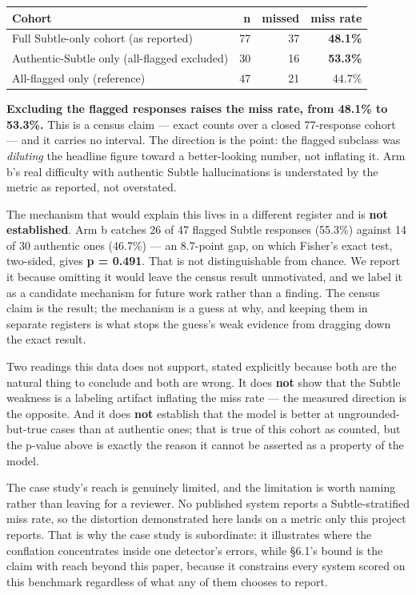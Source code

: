 \documentclass[11pt]{article}
\newcounter{none}
\begin{document}
{\def\LTcaptype{none} %
\begin{longtable}[]{@{}lrrr@{}}
\toprule\noalign{}
Cohort & n & missed & miss rate \\
\midrule\noalign{}
\endhead
\bottomrule\noalign{}
\endlastfoot
Full Subtle-only cohort (as reported) & 77 & 37 & \textbf{48.1\%} \\
Authentic-Subtle only (all-flagged excluded) & 30 & 16 & \textbf{53.3\%} \\
All-flagged only (reference) & 47 & 21 & 44.7\% \\
\end{longtable}
}

\textbf{Excluding the flagged responses raises the miss rate, from 48.1\% to 53.3\%.} This is a
census claim --- exact counts over a closed 77-response cohort --- and it carries no interval.
The direction is the point: the flagged subclass was \emph{diluting} the headline figure toward a
better-looking number, not inflating it. Arm b's real difficulty with authentic Subtle
hallucinations is understated by the metric as reported, not overstated.

The mechanism that would explain this lives in a different register and is \textbf{not
established}. Arm b catches 26 of 47 flagged Subtle responses (55.3\%) against 14 of 30
authentic ones (46.7\%) --- an 8.7-point gap, on which Fisher's exact test, two-sided, gives
\textbf{p = 0.491}. That is not distinguishable from chance. We report it because omitting it
would leave the census result unmotivated, and we label it as a candidate mechanism for
future work rather than a finding. The census claim is the result; the mechanism is a guess
at why, and keeping them in separate registers is what stops the guess's weak evidence from
dragging down the exact result.

Two readings this data does not support, stated explicitly because both are the natural
thing to conclude and both are wrong. It does \textbf{not} show that the Subtle weakness is a
labeling artifact inflating the miss rate --- the measured direction is the opposite. And it
does \textbf{not} establish that the model is better at ungrounded-but-true cases than at
authentic ones; that is true of this cohort as counted, but the p-value above is exactly the
reason it cannot be asserted as a property of the model.

The case study's reach is genuinely limited, and the limitation is worth naming rather than
leaving for a reviewer. No published system reports a Subtle-stratified miss rate, so the
distortion demonstrated here lands on a metric only this project reports. That is why the
case study is subordinate: it illustrates where the conflation concentrates inside one
detector's errors, while §6.1's bound is the claim with reach beyond this paper, because it
constrains every system scored on this benchmark regardless of what any of them chooses to
report.
\end{document}
